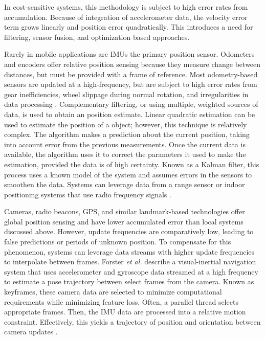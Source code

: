 \documentclass{article}
\begin{document}
    In cost-sensitive systems, this methodology is subject to high error rates from accumulation. Because of integration of accelerometer data, the velocity error term grows linearly and position error quadratically. This introduces a need for filtering, sensor fusion, and optimization based approaches.

      Rarely in mobile applications are IMUs the primary position sensor. Odometers and encoders offer relative position sensing because they measure change between distances, but must be provided with a frame of reference. Most odometry-based sensors are updated at a high-frequency, but are subject to high error rates from gear inefficiencies, wheel slippage during normal rotation, and irregularities in data processing \cite{linchevski_addressing_2007}. Complementary filtering, or using multiple, weighted sources of data, is used to obtain an position estimate. Linear quadratic estimation can be used to estimate the position of a object; however, this technique is relatively complex. The algorithm makes a prediction about the current position, taking into account error from the previous measurements. Once the current data is available, the algorithm uses it to correct the parameters it used to make the estimation, provided the data is of high certainty. Known as a Kalman filter, this process uses a known model of the system and assumes errors in the sensors to smoothen the data. Systems can leverage data from a range sensor \cite{teslic_ekf_2011} or indoor positioning systems that use radio frequency signals \cite{marquez_uwb_2017}.

      Cameras, radio beacons, GPS, and similar landmark-based technologies offer global position sensing and have lower accumulated error than local systems discussed above. However, update frequencies are comparatively low, leading to false predictions or periods of unknown position. To compensate for this phenomenon, systems can leverage data streams with higher update frequencies to interpolate between frames. Forster \textit{et al.} describe a visual-inertial navigation system that uses accelerometer and gyroscope data streamed at a high frequency to estimate a pose trajectory between select frames from the camera. Known as keyframes, these camera data are selected to minimize computational requirements while minimizing feature loss. Often, a parallel thread selects appropriate frames. Then, the IMU data are processed into a relative motion constraint. Effectively, this yields a trajectory of position and orientation between camera updates \cite{forster_CDS_15}.
\end{document}
